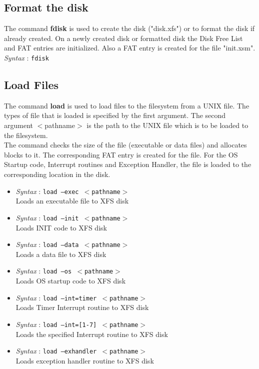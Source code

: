 \documentclass[11pt]{report}
\begin{document}
 
\subsection{Format the disk}
The command \textbf{fdisk} is used to create the disk ("disk.xfs") or to format the disk if already created. On a newly created disk or formatted disk the Disk Free List and FAT entries are initialized. Also a FAT entry is created for the file "init.xsm". \\
\textit{Syntax} : \texttt{fdisk}

\subsection{Load Files}
The command \textbf{load} is used to load files to the filesystem from a UNIX file. The types of file that is loaded is specified by the first argument. The second argument $<$pathname$>$ is the path to the UNIX file which is to be loaded to the filesystem. \\
The command checks the size of the file (executable or data files) and allocates blocks to it. The corresponding FAT entry is created for the file. For the OS Startup code, Interrupt routines and Exception Handler, the file is loaded to the corresponding location in the disk.
\begin{itemize}
	\item \textit{Syntax} : \texttt{load --exec  $<$pathname$>$}  \\
	 Loads an executable file to XFS disk 
	\item \textit{Syntax} : \texttt{load --init  $<$pathname$>$}  \\
	 Loads INIT code to XFS disk 
	\item \textit{Syntax} : \texttt{load --data $<$pathname$>$} \\
	 Loads a data file to XFS disk 
	\item \textit{Syntax} : \texttt{load --os  $<$pathname$>$} \\
	 Loads OS startup code to XFS disk 
	\item \textit{Syntax} : \texttt{load --int=timer $<$pathname$>$}\\
	 Loads Timer Interrupt routine to XFS disk 
	\item \textit{Syntax} : \texttt{load --int=[1-7] $<$pathname$>$}\\
	 Loads the specified Interrupt routine to XFS disk 
	\item \textit{Syntax} : \texttt{load --exhandler $<$pathname$>$}  \\
	 Loads exception handler routine to XFS disk 
	 
\end{itemize}
\end{document}
